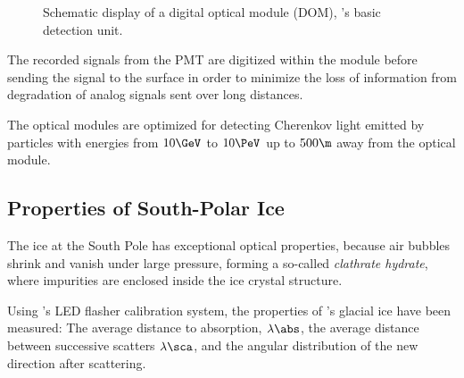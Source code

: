 \begin{figure}[htbp]
  \hfill
  \caption{Schematic display of a digital optical module (DOM), \icecube's basic detection unit.}
  \label{fig:aK4raigh}
\end{figure}


The recorded signals from the PMT are digitized within the module before sending the signal to the surface in order to minimize the loss of information from degradation of analog signals sent over long distances. \cite{firstyearperformance}

The optical modules are optimized for detecting Cherenkov light emitted by particles with energies from $10\GeV$ to $10\PeV$ up to $500\m$ away from the optical module. \cite{instrumentation}


\subsection{Properties of South-Polar Ice}
\label{sec:ice}

The ice at the South Pole has exceptional optical properties, because air bubbles shrink and vanish under large pressure, forming a so-called \textit{clathrate hydrate}, where impurities are enclosed inside the ice crystal structure. \cite{rongenswedishcamera}

Using \icecube's LED flasher calibration system, the properties of \icecube's glacial ice have been measured: The average distance to absorption, $\lambda\abs$, the average distance between successive scatters $\lambda\sca$, and the angular distribution of the new direction after scattering.

